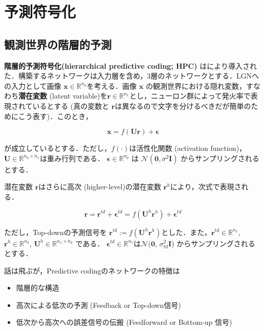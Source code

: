 \section{予測符号化}
\subsection{観測世界の階層的予測}
\textbf{階層的予測符号化(hierarchical predictive coding; HPC)} は\cite{Rao1999-zv}により導入された．構築するネットワークは入力層を含め，3層のネットワークとする．LGNへの入力として画像 $\mathbf{x} \in \mathbb{R}^{n_0}$を考える．画像 $\mathbf{x}$ の観測世界における隠れ変数，すなわち\textbf{潜在変数} (latent variable)を$\mathbf{r} \in \mathbb{R}^{n_1}$とし，ニューロン群によって発火率で表現されているとする (真の変数と $\mathbf{r}$は異なるので文字を分けるべきだが簡単のためにこう表す)．このとき，


\begin{equation}
\mathbf{x} = f(\mathbf{U}\mathbf{r}) + \boldsymbol{\epsilon}
\end{equation}


が成立しているとする．ただし，$f(\cdot)$は活性化関数 (activation function)，$\mathbf{U} \in \mathbb{R}^{n_0 \times n_1}$は重み行列である．
$\boldsymbol{\epsilon} \in \mathbb{R}^{n_0}$ は $\mathcal{N}(\mathbf{0}, \sigma^2 \mathbf{I})$ からサンプリングされるとする．

潜在変数 $\mathbf{r}$はさらに高次 (higher-level)の潜在変数 $\mathbf{r}^h$により，次式で表現される．


\begin{equation}
\mathbf{r} = \mathbf{r}^{td}+\boldsymbol{\epsilon}^{td}=f(\mathbf{U}^h \mathbf{r}^h)+\boldsymbol{\epsilon}^{td}
\end{equation}


ただし，Top-downの予測信号を $\mathbf{r}^{td}:=f(\mathbf{U}^h \mathbf{r}^h)$とした．また，$\mathbf{r}^{td} \in \mathbb{R}^{n_1}$, $\mathbf{r}^{h} \in \mathbb{R}^{n_2}$, $\mathbf{U}^h \in \mathbb{R}^{n_1 \times n_2}$ である．
$\boldsymbol{\epsilon}^{td} \in \mathbb{R}^{n_1}$は$\mathcal{N}(\mathbf{0}$, $\sigma_{td}^2 \mathbf{I}$) からサンプリングされるとする．

話は飛ぶが，Predictive codingのネットワークの特徴は
\begin{itemize}
\item 階層的な構造
\item 高次による低次の予測 (Feedback or Top-down信号)
\item 低次から高次への誤差信号の伝搬 (Feedforward or Bottom-up 信号)
\end{itemize}

